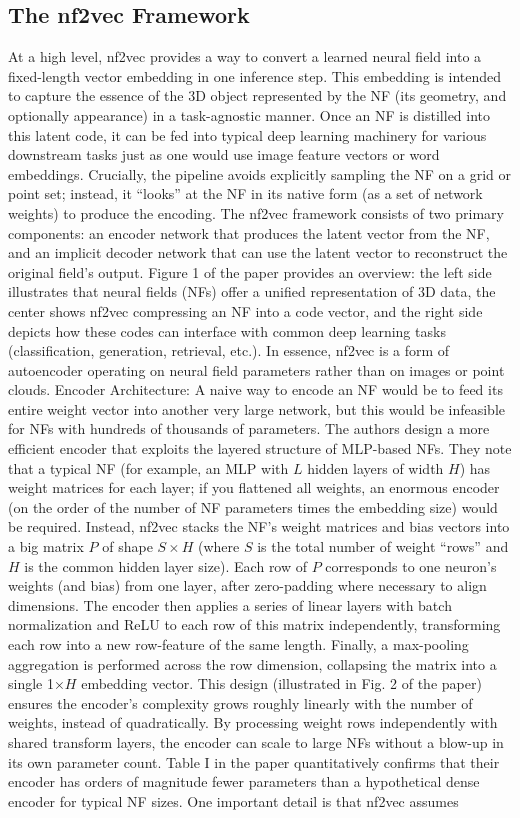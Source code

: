 \documentclass[11pt]{article}
\begin{document}
\subsection{The nf2vec Framework}
At a high level, nf2vec provides a way to convert a learned neural field into a fixed-length vector embedding in one inference step. This embedding is intended to capture the essence of the 3D object represented by the NF (its geometry, and optionally appearance) in a task-agnostic manner. Once an NF is distilled into this latent code, it can be fed into typical deep learning machinery for various downstream tasks just as one would use image feature vectors or word embeddings. Crucially, the pipeline avoids explicitly sampling the NF on a grid or point set; instead, it “looks” at the NF in its native form (as a set of network weights) to produce the encoding. The nf2vec framework consists of two primary components: an encoder network that produces the latent vector from the NF, and an implicit decoder network that can use the latent vector to reconstruct the original field’s output. Figure 1 of the paper provides an overview: the left side illustrates that neural fields (NFs) offer a unified representation of 3D data, the center shows nf2vec compressing an NF into a code vector, and the right side depicts how these codes can interface with common deep learning tasks (classification, generation, retrieval, etc.). In essence, nf2vec is a form of autoencoder operating on neural field parameters rather than on images or point clouds. Encoder Architecture: A naive way to encode an NF would be to feed its entire weight vector into another very large network, but this would be infeasible for NFs with hundreds of thousands of parameters. The authors design a more efficient encoder that exploits the layered structure of MLP-based NFs. They note that a typical NF (for example, an MLP with $L$ hidden layers of width $H$) has weight matrices for each layer; if you flattened all weights, an enormous encoder (on the order of the number of NF parameters times the embedding size) would be required. Instead, nf2vec stacks the NF’s weight matrices and bias vectors into a big matrix $P$ of shape $S \times H$ (where $S$ is the total number of weight “rows” and $H$ is the common hidden layer size). Each row of $P$ corresponds to one neuron’s weights (and bias) from one layer, after zero-padding where necessary to align dimensions. The encoder then applies a series of linear layers with batch normalization and ReLU to each row of this matrix independently, transforming each row into a new row-feature of the same length. Finally, a max-pooling aggregation is performed across the row dimension, collapsing the matrix into a single 1×$H$ embedding vector. This design (illustrated in Fig. 2 of the paper) ensures the encoder’s complexity grows roughly linearly with the number of weights, instead of quadratically. By processing weight rows independently with shared transform layers, the encoder can scale to large NFs without a blow-up in its own parameter count. Table I in the paper quantitatively confirms that their encoder has orders of magnitude fewer parameters than a hypothetical dense encoder for typical NF sizes. One important detail is that nf2vec assumes 
\end{document}
